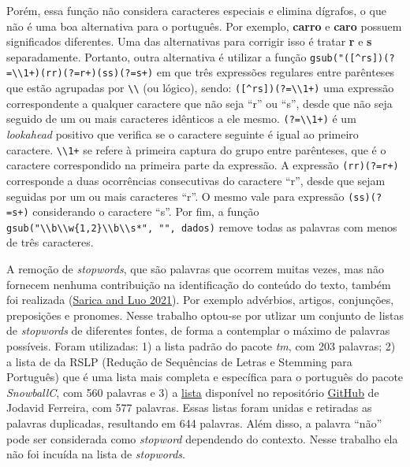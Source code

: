 \documentclass[preprint, 3p,
authoryear]{elsarticle} %
\begin{document}
Porém, essa função não considera caracteres especiais e elimina
dígrafos, o que não é uma boa alternativa para o português. Por exemplo,
\textbf{carro} e \textbf{caro} possuem significados diferentes. Uma das
alternativas para corrigir isso é tratar \textbf{r} e \textbf{s}
separadamente. Portanto, outra alternativa é utilizar a função
\texttt{gsub("({[}\^{}rs{]})(?=\textbackslash{}\textbackslash{}1+)\textbar{}(rr)(?=r+)\textbar{}(ss)(?=s+)}
em que três expressões regulares entre parênteses que estão agrupadas
por \texttt{\textbackslash{}\textbackslash{}} (ou lógico), sendo:
\texttt{({[}\^{}rs{]})(?=\textbackslash{}\textbackslash{}1+)} uma
expressão correspondente a qualquer caractere que não seja ``r'' ou
``s'', desde que não seja seguido de um ou mais caracteres idênticos a
ele mesmo. \texttt{(?=\textbackslash{}\textbackslash{}1+)} é um
\emph{lookahead} positivo que verifica se o caractere seguinte é igual
ao primeiro caractere. \texttt{\textbackslash{}\textbackslash{}1+} se
refere à primeira captura do grupo entre parênteses, que é o caractere
correspondido na primeira parte da expressão. A expressão
\texttt{(rr)(?=r+)} corresponde a duas ocorrências consecutivas do
caractere ``r'', desde que sejam seguidas por um ou mais caracteres
``r''. O mesmo vale para expressão \texttt{(ss)(?=s+)} considerando o
caractere ``s''. Por fim, a função
\texttt{gsub("\textbackslash{}\textbackslash{}b\textbackslash{}\textbackslash{}w\{1,2\}\textbackslash{}\textbackslash{}b\textbackslash{}\textbackslash{}s*",\ "",\ dados)}
remove todas as palavras com menos de três caracteres.

A remoção de \emph{stopwords}, que são palavras que ocorrem muitas
vezes, mas não fornecem nenhuma contribuição na identificação do
conteúdo do texto, também foi realizada
(\protect\hyperlink{ref-Sarica2021}{Sarica and Luo 2021}). Por exemplo
advérbios, artigos, conjunções, preposições e pronomes. Nesse trabalho
optou-se por utlizar um conjunto de listas de \emph{stopwords} de
diferentes fontes, de forma a contemplar o máximo de palavras possíveis.
Foram utilizadas: 1) a lista padrão do pacote \emph{tm}, com 203
palavras; 2) a lista de da RSLP (Redução de Sequências de Letras e
Stemming para Português) que é uma lista mais completa e específica para
o português do pacote \emph{SnowballC}, com 560 palavras e 3) a
\href{https://jodavid.github.io/Slide-Introdu-o-a-Web-Scrapping-com-rvest/stopwords_pt_BR.txt}{lista}
disponível no repositório \href{https://jodavid.github.io/}{GitHub} de
Jodavid Ferreira, com 577 palavras. Essas listas foram unidas e
retiradas as palavras duplicadas, resultando em 644 palavras. Além
disso, a palavra ``não'' pode ser considerada como \emph{stopword}
dependendo do contexto. Nesse trabalho ela não foi incuída na lista de
\emph{stopwords}.
\end{document}
